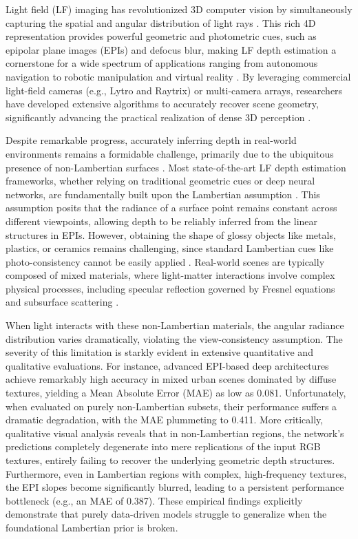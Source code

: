 \documentclass[journal]{IEEEtran}
\begin{document}
Light field (LF) imaging has revolutionized 3D computer vision by simultaneously capturing the spatial and angular distribution of light rays . This rich 4D representation provides powerful geometric and photometric cues, such as epipolar plane images (EPIs) and defocus blur, making LF depth estimation a cornerstone for a wide spectrum of applications ranging from autonomous navigation to robotic manipulation and virtual reality . By leveraging commercial light-field cameras (e.g., Lytro and Raytrix) or multi-camera arrays, researchers have developed extensive algorithms to accurately recover scene geometry, significantly advancing the practical realization of dense 3D perception .

Despite remarkable progress, accurately inferring depth in real-world environments remains a formidable challenge, primarily due to the ubiquitous presence of non-Lambertian surfaces . Most state-of-the-art LF depth estimation frameworks, whether relying on traditional geometric cues or deep neural networks, are fundamentally built upon the Lambertian assumption . This assumption posits that the radiance of a surface point remains constant across different viewpoints, allowing depth to be reliably inferred from the linear structures in EPIs. However, obtaining the shape of glossy objects like metals, plastics, or ceramics remains challenging, since standard Lambertian cues like photo-consistency cannot be easily applied . Real-world scenes are typically composed of mixed materials, where light-matter interactions involve complex physical processes, including specular reflection governed by Fresnel equations and subsurface scattering . 

When light interacts with these non-Lambertian materials, the angular radiance distribution varies dramatically, violating the view-consistency assumption. The severity of this limitation is starkly evident in extensive quantitative and qualitative evaluations. For instance, advanced EPI-based deep architectures achieve remarkably high accuracy in mixed urban scenes dominated by diffuse textures, yielding a Mean Absolute Error (MAE) as low as 0.081. Unfortunately, when evaluated on purely non-Lambertian subsets, their performance suffers a dramatic degradation, with the MAE plummeting to 0.411. More critically, qualitative visual analysis reveals that in non-Lambertian regions, the network's predictions completely degenerate into mere replications of the input RGB textures, entirely failing to recover the underlying geometric depth structures. Furthermore, even in Lambertian regions with complex, high-frequency textures, the EPI slopes become significantly blurred, leading to a persistent performance bottleneck (e.g., an MAE of 0.387). These empirical findings explicitly demonstrate that purely data-driven models struggle to generalize when the foundational Lambertian prior is broken.
\end{document}
